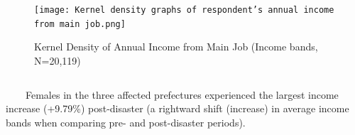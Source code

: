 \documentclass[serif, aspectratio=169]{beamer}
\newcommand{\incomebandlinks}{%
    \vfill %
    \hfill %
    {\small %
        \hyperlink{income_band}{\beamerbutton{Reference}} \,

    }
}
\begin{document}
\begin{frame}[label=income_band_main]
\begin{columns}[T, onlytextwidth]
        \begin{column}{0.485\textwidth}
            \begin{figure}[ht]
                \centering
                \texttt{[image: Kernel density graphs of respondent’s annual income from main job.png]}
                \caption{Kernel Density of Annual Income from Main Job (Income bands, N=20,119)}
                \label{fig:kde_income}
            \end{figure}
        \end{column}
    \end{columns}
    
    \begin{column}{0.49\textwidth}
            \raggedright
    
    \vspace{-2.5cm}
    \hspace{-1.1cm}
\large {\qquad \ \ \ \ Females in the three affected prefectures experienced the largest income increase (+9.79\%) post-disaster (a rightward shift (increase) in average income bands when comparing pre- and post-disaster periods).}
    \end{column}
\vspace{-0.7cm}
\incomebandlinks
\end{frame}
\end{document}
